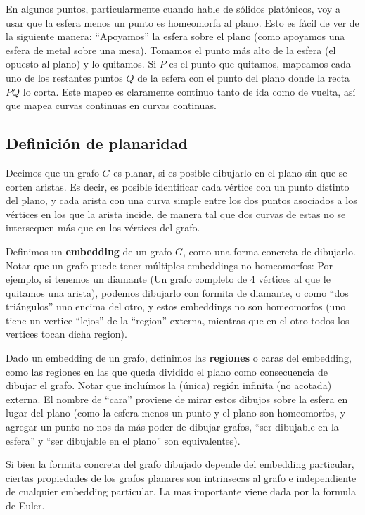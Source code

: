 \documentclass{article}
\begin{document}
En algunos puntos, particularmente cuando hable de sólidos platónicos, voy a usar que la esfera menos un punto es homeomorfa al plano. 
Esto es fácil de ver
de la siguiente manera: ``Apoyamos'' la esfera sobre el plano (como apoyamos una esfera de metal sobre una mesa). Tomamos el punto más alto
de la esfera (el opuesto al plano) y lo quitamos. Si $P$ es el punto que quitamos, mapeamos cada uno de los restantes puntos $Q$ de la esfera
con el punto del plano donde la recta $PQ$ lo corta. Este mapeo es claramente continuo tanto de ida como de vuelta, así que mapea curvas
continuas en curvas continuas.

\subsection{Definición de planaridad}

Decimos que un grafo $G$ es planar, si es posible dibujarlo en el plano sin que se corten aristas. Es decir, es posible identificar cada
vértice con un punto distinto del plano, y cada arista con una curva simple entre los dos puntos asociados a los vértices en los que la arista
incide, de manera tal que dos curvas de estas no se intersequen más que en los vértices del grafo.

Definimos un \textbf{embedding} de un grafo $G$, como una forma concreta de dibujarlo. Notar que un grafo puede tener múltiples embeddings no
homeomorfos: Por ejemplo, si tenemos un diamante (Un grafo completo de 4 vértices al que le quitamos una arista), podemos dibujarlo con
formita de diamante, o como ``dos triángulos'' uno encima del otro, y estos embeddings no son homeomorfos (uno tiene un vertice ``lejos'' de la
``region'' externa, mientras que en el otro todos los vertices tocan dicha region).

Dado un embedding de un grafo, definimos las \textbf{regiones} o caras del embedding, como las regiones en las que queda dividido el plano
como consecuencia de dibujar el grafo. Notar que incluímos la (única) región infinita (no acotada) externa. El nombre de ``cara'' proviene de mirar estos
dibujos sobre la esfera en lugar del plano (como la esfera menos un punto y el plano son homeomorfos, y agregar un punto no nos da más poder
de dibujar grafos, ``ser dibujable en la esfera'' y ``ser dibujable en el plano'' son equivalentes).

Si bien la formita concreta del grafo dibujado depende del embedding particular, ciertas propiedades de los grafos planares son intrinsecas
al grafo e independiente de cualquier embedding particular. La mas importante viene dada por la formula de Euler.
\end{document}

